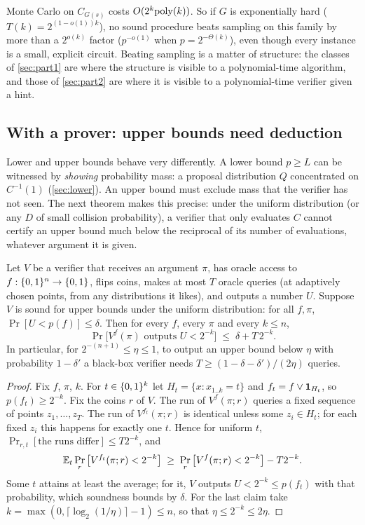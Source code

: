Monte Carlo on $C_{G(s)}$ costs $O(2^k\mathrm{poly}(k))$. So if $G$ is
exponentially hard ($T(k)=2^{(1-o(1))k}$), no sound procedure beats sampling on
this family by more than a $2^{o(k)}$ factor ($p^{-o(1)}$ when $p=2^{-\Theta(k)}$),
even though every instance is a small, explicit circuit. Beating sampling is a
matter of structure: the classes of \cref{sec:part1} are where the structure is visible to
a polynomial-time algorithm, and those of \cref{sec:part2} are where it is
visible to a polynomial-time verifier given a hint.

\subsection{With a prover: upper bounds need deduction}

Lower and upper bounds behave very differently. A lower bound $p\ge L$ can be
witnessed by \emph{showing} probability mass: a proposal distribution $Q$
concentrated on $C^{-1}(1)$ (\cref{sec:lower}). An upper bound must exclude
mass that the verifier has not seen. The next theorem makes this precise:
under the uniform distribution (or any $D$ of small collision probability), a
verifier that only evaluates $C$ cannot certify an upper bound much below the
reciprocal of its number of evaluations, whatever argument it is given.

\begin{theorem}\label{thm:blackbox}
Let $V$ be a verifier that receives an argument $\pi$, has oracle access to
$f:\{0,1\}^n\to\{0,1\}$, flips coins, makes at most $T$ oracle queries (at
adaptively chosen points, from any distributions it likes), and outputs a
number $U$. Suppose $V$ is sound for upper bounds under the uniform
distribution: for all $f,\pi$, $\Pr[U<p(f)]\le\delta$. Then for every $f$,
every $\pi$ and every $k\le n$,
\[
\Pr\big[V^f(\pi)\text{ outputs }U<2^{-k}\big]\;\le\;\delta+T\,2^{-k}.
\]
In particular, for $2^{-(n+1)}\le\eta\le1$, to output an upper bound below $\eta$
with probability $1-\delta'$ a black-box verifier needs
$T\ge(1-\delta-\delta')/(2\eta)$ queries.
\end{theorem}

\begin{proof}
Fix $f$, $\pi$, $k$. For $t\in\{0,1\}^k$ let $H_t=\{x:x_{1..k}=t\}$ and
$f_t=f\vee\mathbf{1}_{H_t}$, so $p(f_t)\ge2^{-k}$. Fix the coins $r$ of $V$. The run
of $V^f(\pi;r)$ queries a fixed sequence of points $z_1,\dots,z_T$. The run of
$V^{f_t}(\pi;r)$ is identical unless some $z_i\in H_t$; for each fixed $z_i$
this happens for exactly one $t$. Hence for uniform $t$,
$\Pr_{r,t}[\text{the runs differ}]\le T2^{-k}$, and
\[
\mathbb{E}_t\Pr_r\big[V^{f_t}(\pi;r)<2^{-k}\big]\;\ge\;\Pr_r\big[V^{f}(\pi;r)<2^{-k}\big]-T2^{-k}.
\]
Some $t$ attains at least the average; for it, $V$ outputs $U<2^{-k}\le
p(f_t)$ with that probability, which soundness bounds by $\delta$.
For the last claim take $k=\max(0,\lceil\log_2(1/\eta)\rceil-1)\le n$, so that
$\eta\le2^{-k}\le2\eta$.
\end{proof}

